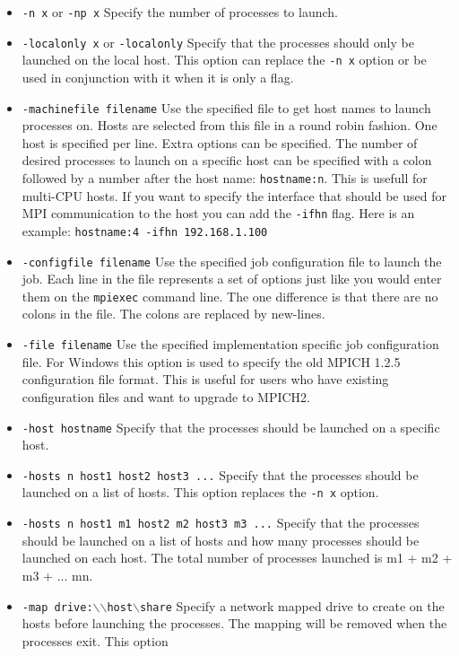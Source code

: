 \documentclass[dvipdfm,11pt]{article}
\begin{document}
\begin{itemize}
\item \texttt{-n x} or \texttt{-np x}
Specify the number of processes to launch.
\item \texttt{-localonly x} or \texttt{-localonly}
Specify that the processes should only be launched on the local host.  This
option can replace the \texttt{-n x} option or be used in conjunction with it
when it is only a flag.
\item \texttt{-machinefile filename}
Use the specified file to get host names to launch processes on.  Hosts are 
selected from this file in a round robin fashion.  One host is specified per
line.  Extra options can be specified.  The number of desired processes to
launch on a specific host can be specified with a colon followed by a number
after the host name: \texttt{hostname:n}.  This is usefull for multi-CPU hosts.
If you want to specify the interface that should be used for MPI communication
to the host you can add the \texttt{-ifhn} flag.  Here is an example:
\texttt{hostname:4 -ifhn 192.168.1.100}
\item \texttt{-configfile filename}
Use the specified job configuration file to launch the job.  Each line in the
file represents a set of options just like you would enter them on the \texttt{mpiexec}
command line.  The one difference is that there are no colons in the file.  The
colons are replaced by new-lines.
\item \texttt{-file filename}
Use the specified implementation specific job configuration file.  For Windows
this option is used to specify the old MPICH 1.2.5 configuration file format.
This is useful for users who have existing configuration files and want to upgrade
to MPICH2.
\item \texttt{-host hostname}
Specify that the processes should be launched on a specific host.
\item \texttt{-hosts n host1 host2 host3 ...}
Specify that the processes should be launched on a list of hosts.  This option
replaces the \texttt{-n x} option.
\item \texttt{-hosts n host1 m1 host2 m2 host3 m3 ...}
Specify that the processes should be launched on a list of hosts and how many
processes should be launched on each host.  The total number of processes 
launched is m1 + m2 + m3 + ... mn.
\item \texttt{-map drive:$\backslash$$\backslash$host$\backslash$share}
Specify a network mapped drive to create on the hosts before launching the 
processes.  The mapping will be removed when the processes exit.  This option

\end{itemize}
\end{document}
